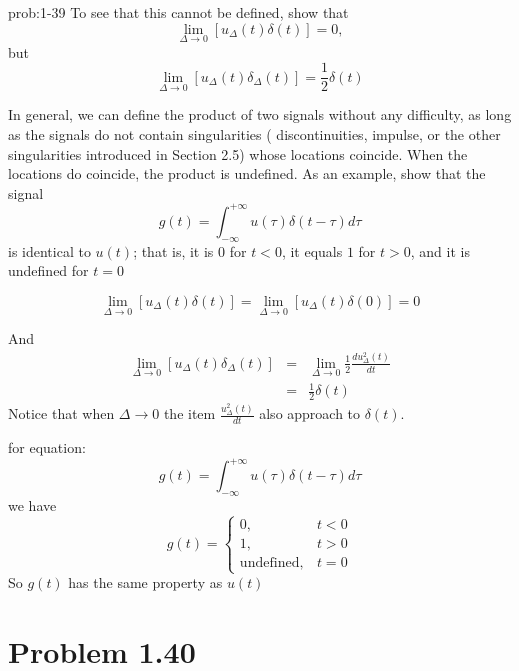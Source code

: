 \documentclass[koma,a4paper,utopia,12pt,listings-color,microtype,paralist,colorlinks,urlcolor=red]{org-article}
\begin{document}
\begin{prob}[]{prob:1-39}
To see that this cannot be defined, show that
\begin{equation*}
\lim_{\Delta\to 0} [u_{\Delta}(t)\delta(t)] = 0,
\end{equation*}
but
\begin{equation*}
\lim_{\Delta\to 0} [u_{\Delta}(t)\delta_{\Delta}(t)] = \frac{1}{2} \delta(t)
\end{equation*}

In general, we can define the product of two signals without any difficulty,
as long as the signals do not contain  singularities  ( discontinuities,
impulse, or the other singularities introduced in Section 2.5) whose
locations coincide. When the locations do coincide, the product is
undefined. As an example, show that the signal
\begin{equation*}
g(t) = \int_{-\infty}^{+\infty} u( \tau )\delta(t-\tau)d\tau
\end{equation*}
is identical to \(u(t)\); that is, it is \(0\) for \(t < 0\), it equals
\(1\) for \(t> 0\), and it is undefined for \(t=0\)
\label{prob:1-39}
\end{prob}

\begin{equation*}
\lim_{\Delta\to 0} [u_{\Delta}(t)\delta(t)] = \lim_{\Delta\to 0} [u_{\Delta}(t)\delta(0)] = 0
\end{equation*}

And
\begin{eqnarray*}
\lim_{\Delta\to 0} [u_{\Delta}(t)\delta_{\Delta}(t)] &=& \lim_{\Delta\to 0 } \frac{1}{2} \frac{d u_{\Delta}^{2}(t)}{dt} \\
&=& \frac{1}{2} \delta(t)
\end{eqnarray*}
Notice that when \(\Delta\to 0\) the item  \(\frac{u_{\Delta}^{2}(t)}{dt}\)
also approach to \(\delta(t)\).

for equation:
\begin{equation*}
g(t) = \int_{-\infty}^{+\infty} u( \tau )\delta(t-\tau)d\tau
\end{equation*}
we have
\begin{equation*}
g(t) =
\begin{cases}
0, & t< 0 \\
1, & t> 0 \\
\mathrm{undefined}, & t = 0
\end{cases}

\end{equation*}
So \(g(t)\) has the same property as \(u(t)\)
\section{Problem 1.40}
\label{sec:orge406af3}
\end{document}
